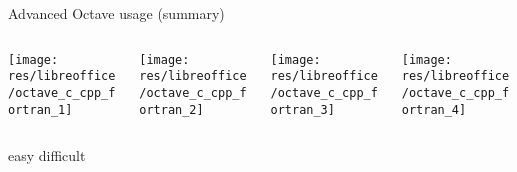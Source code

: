 \begin{frame}{Advanced Octave usage (summary)}
\begin{columns}
\begin{column}{0.15\textwidth}
\texttt{[image: res/libreoffice/octave\_c\_cpp\_fortran\_1]}
\end{column}
\begin{column}{0.15\textwidth}
\texttt{[image: res/libreoffice/octave\_c\_cpp\_fortran\_2]}
\end{column}
\begin{column}{0.3\textwidth}
\texttt{[image: res/libreoffice/octave\_c\_cpp\_fortran\_3]}
\end{column}
\begin{column}{0.3\textwidth}
\texttt{[image: res/libreoffice/octave\_c\_cpp\_fortran\_4]}
\end{column}
\end{columns}
easy \hfill difficult
\end{frame}